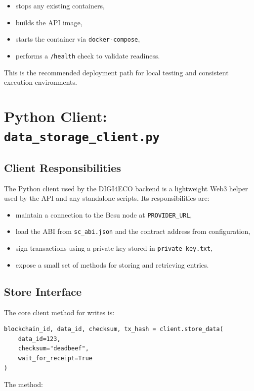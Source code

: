 \documentclass[11pt,a4paper]{article}
\begin{document}
\begin{itemize}[noitemsep]
  \item stops any existing containers,
  \item builds the API image,
  \item starts the container via \texttt{docker-compose},
  \item performs a \texttt{/health} check to validate readiness.
\end{itemize}

This is the recommended deployment path for local testing and consistent execution environments.

\section{Python Client: \texttt{data\_storage\_client.py}}

\subsection{Client Responsibilities}

The Python client used by the DIGI4ECO backend is a lightweight Web3 helper used by the API and any standalone scripts. Its responsibilities are:

\begin{itemize}[noitemsep]
  \item maintain a connection to the Besu node at \texttt{PROVIDER\_URL},
  \item load the ABI from \texttt{sc\_abi.json} and the contract address from configuration,
  \item sign transactions using a private key stored in \texttt{private\_key.txt},
  \item expose a small set of methods for storing and retrieving entries.
\end{itemize}

\subsection{Store Interface}

The core client method for writes is:

\begin{lstlisting}
blockchain_id, data_id, checksum, tx_hash = client.store_data(
    data_id=123,
    checksum="deadbeef",
    wait_for_receipt=True
)
\end{lstlisting}

The method:
\end{document}
